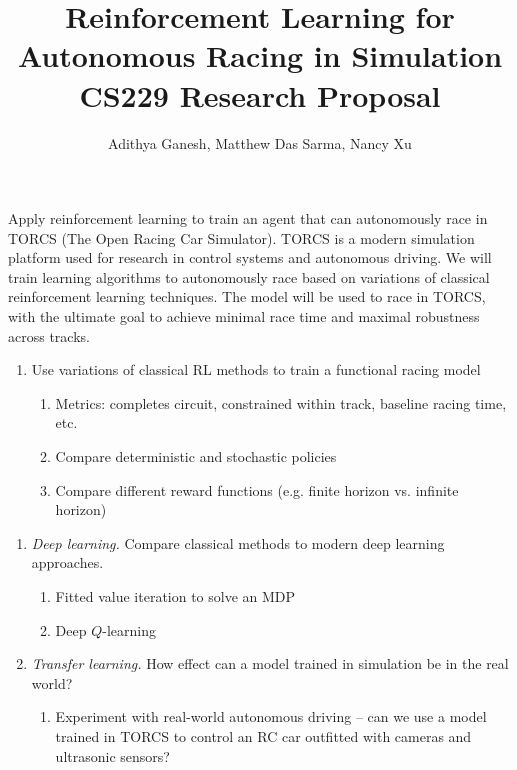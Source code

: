 \documentclass[a4paper]{article}
\title{Reinforcement Learning for Autonomous Racing in Simulation \\
CS229 Research Proposal}
\author{Adithya Ganesh, Matthew Das Sarma, Nancy Xu}
\begin{document}
\maketitle

 Apply reinforcement learning to train an agent that can autonomously race in TORCS (The Open Racing Car Simulator). TORCS is a modern simulation platform used for research in control systems and autonomous driving.  We will train learning algorithms to autonomously race based on variations of classical reinforcement learning techniques.  The model will be used to race in TORCS, with the ultimate goal to achieve minimal race time and maximal robustness across tracks.  \\


\begin{enumerate}
  \item Use variations of classical RL methods to train a functional racing model
    \begin{enumerate}
      \item Metrics: completes circuit, constrained within track, baseline racing time, etc.
      \item Compare deterministic and stochastic policies
      \item Compare different reward functions (e.g. finite horizon vs. infinite horizon)
    \end{enumerate}
\end{enumerate}


\begin{enumerate}
  \item {\it Deep learning.} Compare classical methods to modern deep learning approaches.
    \begin{enumerate}
      \item Fitted value iteration to solve an MDP
      \item Deep $Q$-learning
    \end{enumerate}
  \item {\it Transfer learning.} How effect can a model trained in simulation be in the real world?
    \begin{enumerate}
      \item Experiment with real-world autonomous driving -- can we use a model trained in TORCS to control an RC car outfitted with cameras and ultrasonic sensors?
    \end{enumerate}
\end{enumerate}
\end{document}
